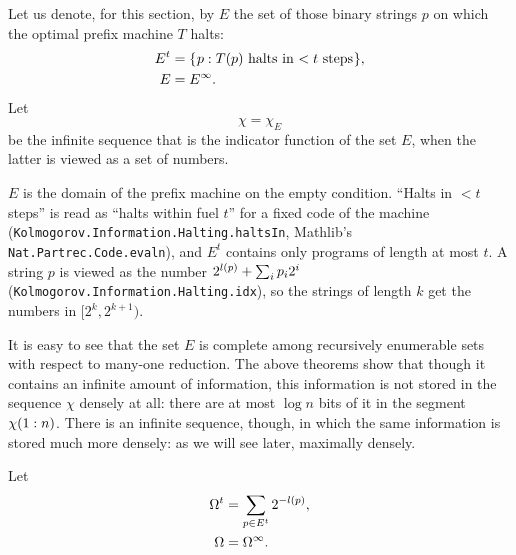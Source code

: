  \begin{definition}
  \label{def:g3.2.3}
  \leanok
Let us denote, for this section, by \( E \) the set of those binary strings \( p \) on
which the optimal prefix machine \( T \) halts:
 \begin{equation}\label{eq:E^{t}}
 \begin{split}
     E^{t} &= \setof{p : T(p) \txt{ halts in \( < t \) steps} },
\\   E     &= E^{\infty}.
 \end{split}
 \end{equation}
Let 
 \begin{equation}\label{eq:chi}
  \chi = \chi_{E}
 \end{equation}
be the infinite sequence that is the indicator function of the
set \( E \), when the latter is viewed as a set of numbers.
 \end{definition}

\begin{formalization}
\( E \) is the domain of the prefix machine on the empty condition. ``Halts in \( < t \) steps''
is read as ``halts within fuel \( t \)'' for a fixed code of the machine
(\texttt{Kolmogorov.Information.Halting.haltsIn}, Mathlib's \texttt{Nat.Partrec.Code.evaln}),
and \( E^{t} \) contains only programs of length at most \( t \). A string \( p \) is viewed as
the number \( 2^{l(p)} + \sum_{i} p_{i} 2^{i} \) (\texttt{Kolmogorov.Information.Halting.idx}),
so the strings of length \( k \) get the numbers in \( [2^{k}, 2^{k+1}) \).
\end{formalization}

It is easy to see that the set \( E \) is complete among recursively enumerable
sets with respect to many-one reduction.
The above theorems show that though it contains an infinite amount of
information, this information is not stored in the sequence \( \chi \) densely at
all: there are at most \( \log n \) bits of it in the segment \( \chi(1:n) \).
There is an infinite sequence, though, in which the same information is
stored much more densely: as we will see later, maximally densely.

 \begin{definition}
  \label{def:g3.2.4}
  \leanok
Let
 \begin{equation}\label{eq:Og}
 \begin{split}
   \Omega^{t} &= \sum_{p \in E^{t}} 2^{-l(p)},
\\ \Omega     &= \Omega^{\infty}.
 \end{split}
 \end{equation}
 \end{definition}

